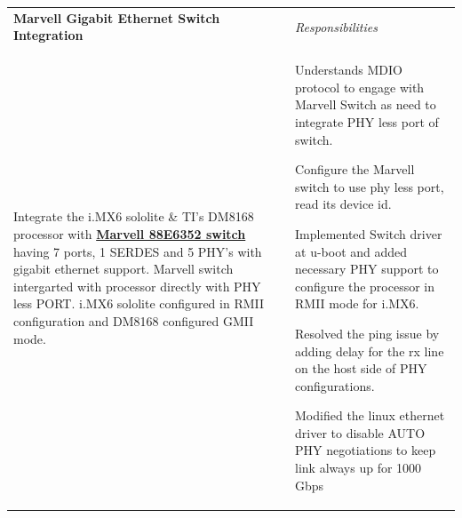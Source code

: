 \indent\begin{tabularx}{\textwidth}{p{} p{\RIGHTCOLUMNWIDTH}} %
    {\textbf{Marvell Gigabit Ethernet Switch Integration}} & \emph{Responsibilities} \\%
    Integrate the i.MX6 sololite \& TI's DM8168 processor with \href{https://www.marvell.com/switching/link-street/}{\textbf{Marvell 88E6352 switch}} having 7 ports, 1 SERDES and 5 PHY's with gigabit ethernet support. Marvell switch intergarted with processor directly with PHY less PORT. i.MX6 sololite configured in RMII configuration and DM8168 configured GMII mode.  &
        \vspace{-\topsep}\vspace{2pt} \begin{myitemize}
    \footnotesize {
         \item Understands MDIO protocol to engage with Marvell Switch as need to integrate PHY less port of switch.
         \item Configure the Marvell switch to use phy less port, read its device id.
         \item Implemented Switch driver at u-boot and added necessary PHY support to configure the processor in RMII mode for i.MX6.
         \item Resolved the ping issue by adding delay for the rx line on the host side of PHY configurations.
         \item Modified the linux ethernet driver to disable AUTO PHY negotiations to keep link always up for 1000 Gbps
    }
   \end{myitemize}\vspace{-\topsep}%
\end{tabularx}
\endgroup
%
%
\vspace{-4pt}
%
%
